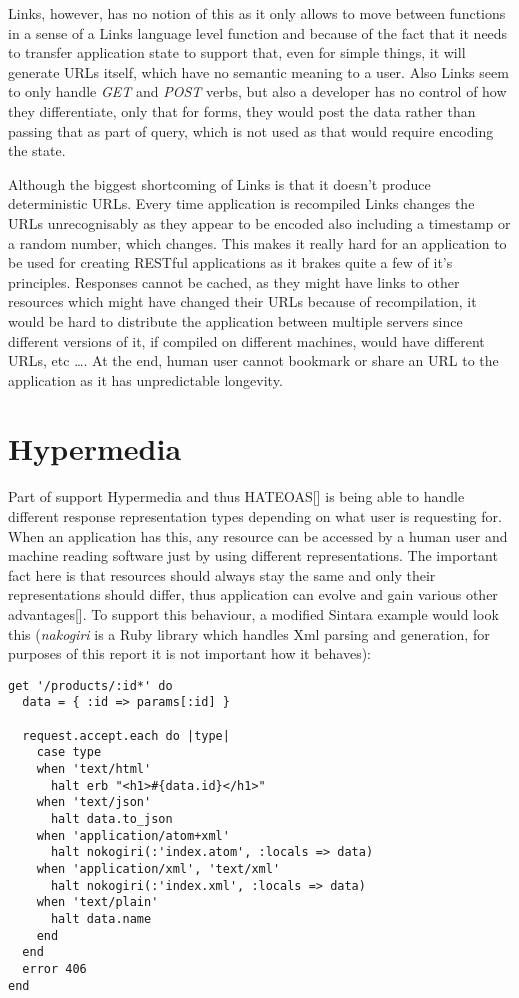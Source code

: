 Links, however, has no notion of this as it only allows to move between functions in a sense of a Links language level function and because of the fact that it needs to transfer application state to support that, even for simple things, it will generate URLs itself, which have no semantic meaning to a user. Also Links seem to only handle \textit{GET} and \textit{POST} verbs, but also a developer has no control of how they differentiate, only that for forms, they would post the data rather than passing that as part of query, which is not used as that would require encoding the state.

Although the biggest shortcoming of Links is that it doesn't produce deterministic URLs. Every time application is recompiled Links changes the URLs unrecognisably as they appear to be encoded also including a timestamp or a random number, which changes. This makes it really hard for an application to be used for creating RESTful applications as it brakes quite a few of it's principles. Responses cannot be cached, as they might have links to other resources which might have changed their URLs because of recompilation, it would be hard to distribute the application between multiple servers since different versions of it, if compiled on different machines, would have different URLs, etc \ldots. At the end, human user cannot bookmark or share an URL to the application as it has unpredictable longevity. 

\section{Hypermedia}

Part of support Hypermedia and thus HATEOAS[] is being able to handle different response representation types depending on what user is requesting for. When an application has this, any resource can be accessed by a human user and machine reading software just by using different representations. The important fact here is that resources should always stay the same and only their representations should differ, thus application can evolve and gain various other advantages[]. To support this behaviour, a modified Sintara example would look this (\textit{nakogiri} is a Ruby library which handles Xml parsing and generation, for purposes of this report it is not important how it behaves):

\begin{codelisting}
\begin{verbatim}
get '/products/:id*' do
  data = { :id => params[:id] }

  request.accept.each do |type|
    case type
    when 'text/html'
      halt erb "<h1>#{data.id}</h1>"
    when 'text/json'
      halt data.to_json
    when 'application/atom+xml'
      halt nokogiri(:'index.atom', :locals => data)
    when 'application/xml', 'text/xml'
      halt nokogiri(:'index.xml', :locals => data)
    when 'text/plain'
      halt data.name
    end
  end
  error 406
end
\end{verbatim}
\end{codelisting}

